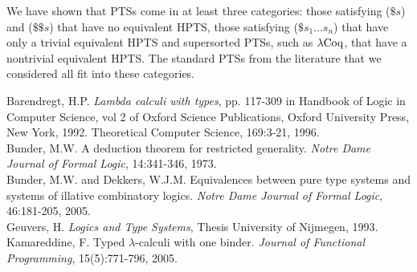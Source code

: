 \documentclass{LMCS}
\def\rbox#1{\mbox{\rm #1}}
\begin{document}
  \noindent We have shown that PTSs come in at least three categories:
  those satisfying ($\$s$) and ($\$\$s$) that have no equivalent HPTS,
  those satisfying ($\$s_1\dots s_n$) that have only a trivial
  equivalent HPTS and supersorted PTSs, such as $\lambda\rbox{Coq}$,
  that have a nontrivial equivalent HPTS. The standard PTSs from the
  literature that we considered all fit into these categories.


\begin{thebibliography}{5}
 Barendregt, H.P.
{\em Lambda calculi with types}, pp. 117-309 in Handbook of Logic in
Computer Science, vol 2 of Oxford Science Publications, Oxford
University Press, New York, 1992. Theoretical Computer Science,
169:3-21, 1996.\\
 Bunder, M.W. A
deduction theorem for restricted generality. {\em Notre Dame Journal of
Formal Logic}, 14:341-346, 1973.\\
 Bunder,
M.W. and Dekkers, W.J.M. Equivalences between pure type systems and
systems of illative combinatory logics. {\em Notre Dame Journal of Formal
Logic}, 46:181-205, 2005.\\
 Geuvers,
H. {\em Logics and Type Systems}, Thesis University of Nijmegen,
1993.\\
 Kamareddine, F. Typed
$\lambda$-calculi with one binder. {\em Journal of Functional
Programming}, 15(5):771-796, 2005.
\end{thebibliography}
\end{document}
